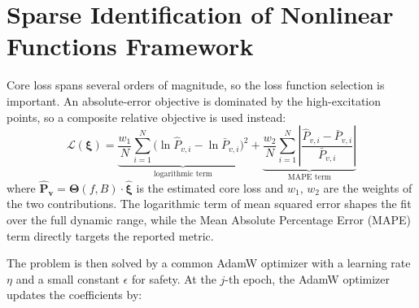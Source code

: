 \section{Sparse Identification of Nonlinear Functions Framework}
Core loss spans several orders of magnitude, so the loss function selection is important. An absolute-error objective is dominated by the high-excitation points, so a composite relative objective is used instead:
\begin{equation}
    \mathcal{L}(\boldsymbol{\xi}) =
    \underbrace{\frac{w_1}{N}\sum_{i=1}^{N}\big(\ln\hat{P}_{v,i}-\ln\bar{P}_{v,i}\big)^{2}}_{\text{logarithmic term}}
    + \underbrace{\frac{w_2}{N}\sum_{i=1}^{N}\left|\frac{\hat{P}_{v,i}-\bar{P}_{v,i}}{\bar{P}_{v,i}}\right|}_{\text{MAPE term}}
    \label{eq:objective}
\end{equation}
where $\boldsymbol{\hat{P}_v}=\boldsymbol{\Theta}(f,B) \cdot \boldsymbol{\hat{\xi}}$ is the estimated core loss and $w_1$, $w_2$ are the weights of the two contributions. The logarithmic term of mean squared error shapes the fit over the full dynamic range, while the Mean Absolute Percentage Error (MAPE) term directly targets the reported metric.



The problem is then solved by a common AdamW optimizer with a learning rate $\eta$ and a small constant $\epsilon$ for safety. At the $j$-th epoch, the AdamW optimizer updates the coefficients by:


